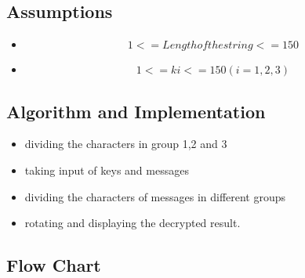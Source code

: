 \documentclass[12pt]{article}
\begin{document}
			
		
		
		\subsection{Assumptions}
		
			\begin{itemize}
				\item $$ 1 <= Length of the string <=150 $$

				\item $$ 1<= ki <=150 (i=1,2,3) $$
			\end{itemize}
		
		\subsection{Algorithm and Implementation~\cite{}}
		
			\begin{itemize}
			\item dividing the characters in group 1,2 and 3
			\item taking input of keys and messages
			\item dividing the characters of messages in different groups
			\item rotating and displaying the decrypted result.
			\end{itemize}
		
		\subsection{Flow Chart}
		
\end{document}
